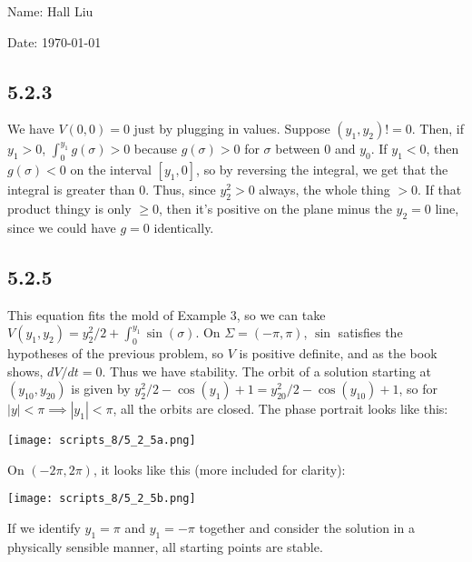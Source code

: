 \documentclass{article}
\begin{document}
Name: Hall Liu

Date: \today 
\vspace{1.5cm}

\subsection*{5.2.3}
We have $V(0,0)=0$ just by plugging in values. Suppose $(y_1,y_2)!=0$. Then, if $y_1>0$, $\int_0^{y_1}g(\sigma)>0$ because $g(\sigma)>0$ for $\sigma$ between $0$ and $y_0$. If $y_1<0$, then $g(\sigma)<0$ on the interval $[y_1,0]$, so by reversing the integral, we get that the integral is greater than $0$. Thus, since $y_2^2>0$ always, the whole thing $>0$. If that product thingy is only $\geq 0$, then it's positive on the plane minus the $y_2=0$ line, since we could have $g=0$ identically.
\subsection*{5.2.5}
This equation fits the mold of Example 3, so we can take $V(y_1,y_2)=y_2^2/2+\int_0^{y_1}\sin(\sigma)$. On $\Sigma=(-\pi,\pi)$, $\sin$ satisfies the hypotheses of the previous problem, so $V$ is positive definite, and as the book shows, $dV/dt=0$. Thus we have stability. The orbit of a solution starting at $(y_{10},y_{20})$ is given by $y_2^2/2-\cos(y_1)+1=y_{20}^2/2-\cos(y_{10})+1$, so for $|y|<\pi\implies|y_1|<\pi$, all the orbits are closed. The phase portrait looks like this:

\texttt{[image: scripts\_8/5\_2\_5a.png]}

On $(-2\pi,2\pi)$, it looks like this (more included for clarity):

\texttt{[image: scripts\_8/5\_2\_5b.png]}

If we identify $y_1=\pi$ and $y_1=-\pi$ together and consider the solution in a physically sensible manner, all starting points are stable. 
\end{document}
